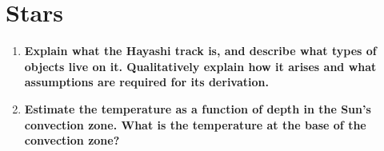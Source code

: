 \documentclass[12pt, letterpaper, preprint]{aastex}
\begin{document}
\section*{Stars}
\begin{enumerate}
  \item \textbf{Explain what the Hayashi track is, 
      and describe what types of objects live on it.
      Qualitatively explain how it arises and what 
      assumptions are required for its derivation.}
  \item \textbf{Estimate the temperature as a function 
      of depth in the Sun’s convection zone.
      What is the temperature at the base of the convection zone?}
\end{enumerate}
\end{document}
